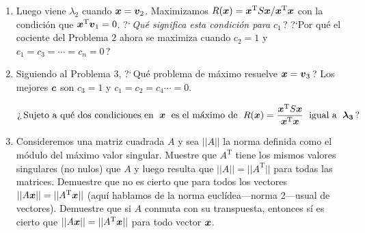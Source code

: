 \documentclass[12pt,a4paper]{article}
\newcommand{\bi}[1]{\hbox{\boldmath$#1$}}
\newcommand\1{\mbox{\,\vrule height-0.8pt depth1.0pt width2pc\,}}
\newcommand\2{\mbox{\,\vrule height-0.8pt depth1.0pt width1pc\,}}
\DeclareRobustCommand\transp{^{\mathrm{T}}}
\newcommand{\bu}{\hbox{\boldmath$u$}}
\newcommand{\bv}{\hbox{\boldmath$v$}}
\begin{document}
\begin{enumerate}
\item Luego viene $\lambda_2$ cuando $\bi{x}=\bv_2$. Maximizamos $R(\bi{x})=\bi{x}\transp S\bi{x}/\bi{x}\transp\bi{x}$ con la condici\'on que $\bi{x}\transp\bv_1=0$. ?`\,\emph{Qué significa esta condici\'on para} $c_1$\,? ?`Por qu\'e el cociente del Problema $2$ ahora se maximiza cuando $c_2=1$ y $c_1=c_3=\cdots=c_n=0$\,?


%

\item Siguiendo al  Problema 3, ?`\,Qu\'e problema de m\'aximo resuelve   $\bi{x}=\bv_3$\,? Los mejores $\bi{c}$ son  $c_3=1$ y  $c_1=c_2=c_4\cdots=0$.

$$
\text{?`\,Sujeto a qué dos condiciones en \;$\bi{x}$\; es el m\'aximo de } \;R(\bi{x})=\dfrac{\bi{x}\transp S\bi{x}}{\bi{x}\transp\bi{x}}\text{ \;igual a\;  }\bi{\lambda_3}\,?
$$



\item Consideremos una matriz cuadrada $A$ y sea $||A||$ la norma definida como el módulo del m\'aximo valor singular. Muestre que $A\transp$ tiene los mismos valores singulares (no nulos) que $A$ y luego resulta que $||A||=||A\transp||$ para todas las matrices. Demuestre que no es cierto que para todos los vectores $||A\bi{x}||=||A\transp\bi{x}||$ (aquí hablamos de la norma euclídea---norma 2---usual de vectores). Demuestre que si $A$ conmuta con su transpuesta, entonces sí es cierto que $||A\bi{x}||=||A\transp\bi{x}||$ para todo vector $\bi{x}$.

 






\end{enumerate}
\end{document}
